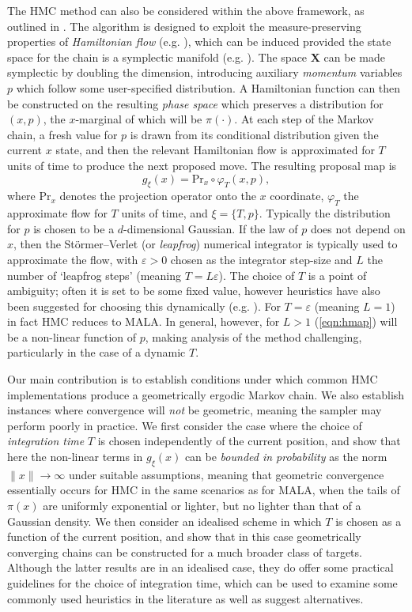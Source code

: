 \documentclass[bj,numbers,noshowframe]{imsart}
\newcommand{\X}{\mathbf{X}}
\newcommand{\e}{\varepsilon}
\theoremstyle{definition}
\theoremstyle{plain}
\theoremstyle{definition}
\begin{document}
The HMC method can also be considered within the above framework, as outlined in \citep{betancourt2014geometric}.  The algorithm is designed to exploit the measure-preserving properties of \emph{Hamiltonian flow} (e.g. \citep{leimkuhler2004simulating}), which can be induced provided the state space for the chain is a symplectic manifold (e.g. \citep{lee2012symplectic}).  The space $\X$ can be made symplectic by doubling the dimension, introducing auxiliary \emph{momentum} variables $p$ which follow some user-specified distribution.  A Hamiltonian function can then be constructed on the resulting \emph{phase space} which preserves a distribution for $(x,p)$, the $x$-marginal of which will be $\pi(\cdot)$.  At each step of the Markov chain, a fresh value for $p$ is drawn from its conditional distribution given the current $x$ state, and then the relevant Hamiltonian flow is approximated for $T$ units of time to produce the next proposed move.  The resulting proposal map is
\begin{equation} \label{eqn:hmap}
g_\xi(x) = \text{Pr}_x \circ \varphi_T(x,p),
\end{equation}
where $\text{Pr}_x$ denotes the projection operator onto the $x$ coordinate, $\varphi_T$ the approximate flow for $T$ units of time, and $\xi = \{T,p\}$.  Typically the distribution for $p$ is chosen to be a $d$-dimensional Gaussian.  If the law of $p$ does not depend on $x$, then the St\"{o}rmer--Verlet (or \emph{leapfrog}) numerical integrator is typically used to approximate the flow, with $\e>0$ chosen as the integrator step-size and $L$ the number of `leapfrog steps' (meaning $T = L\e$).  The choice of $T$ is a point of ambiguity; often it is set to be some fixed value, however heuristics have also been suggested for choosing this dynamically (e.g. \citep{hoffman-gelman:2013}).  For $T = \e$ (meaning $L = 1$) in fact HMC reduces to MALA.  In general, however, for $L > 1$ (\ref{eqn:hmap}) will be a non-linear function of $p$, making analysis of the method challenging, particularly in the case of a dynamic $T$.

Our main contribution is to establish conditions under which common HMC implementations produce a geometrically ergodic Markov chain.  We also establish instances where convergence will \emph{not} be geometric, meaning the sampler may perform poorly in practice.  We first consider the case where the choice of \emph{integration time} $T$ is chosen independently of the current position, and show that here the non-linear terms in $g_\xi(x)$ can be \emph{bounded in probability} as the norm $\|x\| \to \infty$ under suitable assumptions, meaning that geometric convergence essentially occurs for HMC in the same scenarios as for MALA, when the tails of $\pi(x)$ are uniformly exponential or lighter, but no lighter than that of a Gaussian density.  We then consider an idealised scheme in which $T$ is chosen as a function of the current position, and show that in this case geometrically converging chains can be constructed for a much broader class of targets.  Although the latter results are in an idealised case, they do offer some practical guidelines for the choice of integration time, which can be used to examine some commonly used heuristics in the literature as well as suggest alternatives.
\end{document}
